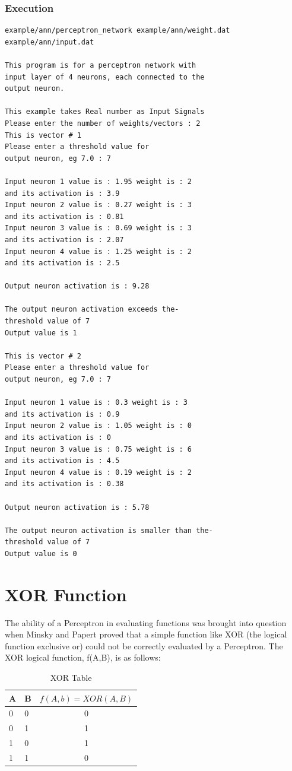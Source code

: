 \documentclass[12pt, right open]{memoir}
\begin{document}
\subsection{Execution}
\begin{lstlisting}[caption={perceptron\_netwotk.cpp output}] %language=C++, 
example/ann/perceptron_network example/ann/weight.dat example/ann/input.dat

This program is for a perceptron network with  
input layer of 4 neurons, each connected to the 
output neuron.

This example takes Real number as Input Signals
Please enter the number of weights/vectors : 2
This is vector # 1
Please enter a threshold value for 
output neuron, eg 7.0 : 7

Input neuron 1 value is : 1.95 weight is : 2  
and its activation is : 3.9
Input neuron 2 value is : 0.27 weight is : 3  
and its activation is : 0.81
Input neuron 3 value is : 0.69 weight is : 3  
and its activation is : 2.07
Input neuron 4 value is : 1.25 weight is : 2  
and its activation is : 2.5

Output neuron activation is : 9.28

The output neuron activation exceeds the-
threshold value of 7
Output value is 1

This is vector # 2
Please enter a threshold value for 
output neuron, eg 7.0 : 7

Input neuron 1 value is : 0.3 weight is : 3  
and its activation is : 0.9
Input neuron 2 value is : 1.05 weight is : 0  
and its activation is : 0
Input neuron 3 value is : 0.75 weight is : 6  
and its activation is : 4.5
Input neuron 4 value is : 0.19 weight is : 2  
and its activation is : 0.38

Output neuron activation is : 5.78

The output neuron activation is smaller than the- 
threshold value of 7
Output value is 0
\end{lstlisting}


\chapter{XOR Function}
The ability of a Perceptron in evaluating functions was brought into question
when Minsky and Papert proved that a simple function like XOR (the logical
function exclusive or) could not be correctly evaluated by a Perceptron. The
XOR logical function, f(A,B), is as follows: \\

\begin{table} 
\caption{XOR Table}
\label{tab:xor_table}
\begin{tabular}{|l|l|c|}
\hline
A & B & $f(A,b) = XOR(A,B)$ \\
\hline
0 & 0 & 0 \\ 
\hline
0 & 1 & 1 \\ 
\hline
1 & 0 & 1 \\ 
\hline
1 & 1 & 0 \\ 
\hline
\end{tabular}
\end{table}
\end{document}
